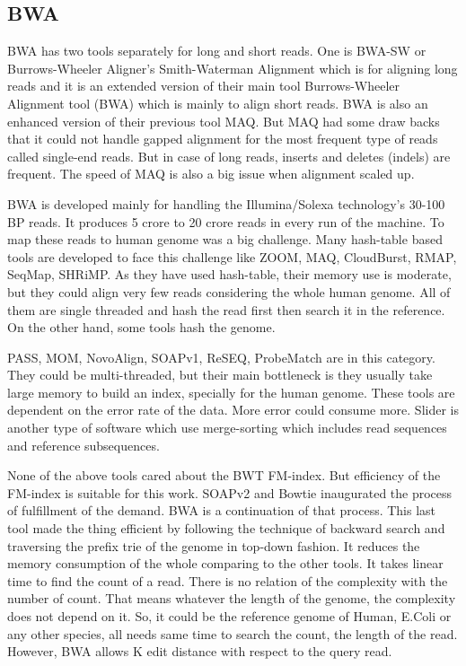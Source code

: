 \documentclass{standalone}
\begin{document}
\subsection{BWA}
BWA has two tools separately for long\cite{BWA_long} and short\cite{BWA_short} reads. One is BWA-SW or Burrows-Wheeler Aligner's Smith-Waterman Alignment which is for aligning long reads and it is an extended version of their main tool Burrows-Wheeler Alignment tool (BWA) which is mainly to align short reads. BWA is also an enhanced version of their previous tool MAQ\cite{mapLi}. But MAQ had some draw backs that it could not handle gapped alignment for the most frequent type of reads called single-end reads. But in case of long reads, inserts and deletes (indels) are frequent. The speed of MAQ is also a big issue when alignment scaled up.

BWA is developed mainly for handling the Illumina/Solexa\cite{dnaB} technology's 30-100 BP reads. It produces 5 crore to 20 crore reads in every run of the machine. To map these reads to human genome was a big challenge. Many hash-table based tools are developed to face this challenge like ZOOM\cite{ZOOM}, MAQ\cite{geneB}, CloudBurst\cite{CloudBurst}, RMAP\cite{RMAP}, SeqMap\cite{SeqMap}, SHRiMP\cite{SHRIMP}. As they have used hash-table, their memory use is moderate, but they could align very few reads considering the whole human genome. All of them are single threaded and hash the read first then search it in the reference\cite{BWA_short}. On the other hand, some tools hash the genome. 

PASS\cite{PASS}, MOM\cite{MOM}, NovoAlign\cite{NovoCraft}, SOAPv1\cite{SOAPv1}, ReSEQ\cite{RESEQ}, ProbeMatch\cite{ProbeMatch} are in this category. They could be multi-threaded, but their main bottleneck is they usually take large memory to build an index, specially for the human genome\cite{BWA_short}. These tools are dependent on the error rate of the data. More error could consume more. Slider\cite{Slider} is another type of software which use merge-sorting which includes read sequences and reference subsequences.

None of the above tools cared about the BWT FM-index\cite{BWT}. But efficiency of the FM-index is suitable for this work. SOAPv2\cite{SOAPv2} and Bowtie \cite{bowtie} inaugurated the process of fulfillment  of the demand. BWA\cite{BWA_short} is a continuation of that process. This last tool made the thing efficient by following the technique of backward search\cite{backward_search} and traversing the prefix trie of the genome in top-down fashion\cite{TopDownFM}. It reduces the memory consumption of the whole comparing to the other tools.
It takes linear time to find the count of a read. There is no relation of the complexity with the number of count. That means whatever the length of the genome, the complexity does not depend on it. So, it could be the reference genome of Human, E.Coli or any other species, all needs same time to search the count, the length of the read. However, BWA allows K edit distance with respect to the query read.
\end{document}
